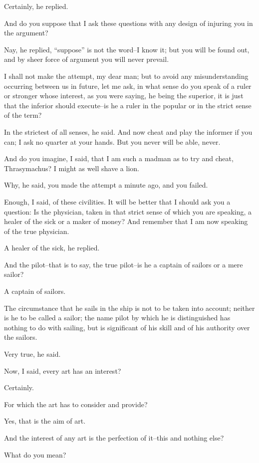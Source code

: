 Certainly, he replied.

And do you suppose that I ask these questions with any design of
injuring you in the argument?

Nay, he replied, ``suppose'' is not the word--I know it; but you will be
found out, and by sheer force of argument you will never prevail.

I shall not make the attempt, my dear man; but to avoid any
misunderstanding occurring between us in future, let me ask, in what
sense do you speak of a ruler or stronger whose interest, as you were
saying, he being the superior, it is just that the inferior should
execute--is he a ruler in the popular or in the strict sense of the
term?

In the strictest of all senses, he said. And now cheat and play the
informer if you can; I ask no quarter at your hands. But you never will
be able, never.

And do you imagine, I said, that I am such a madman as to try and cheat,
Thrasymachus? I might as well shave a lion.

Why, he said, you made the attempt a minute ago, and you failed.

Enough, I said, of these civilities. It will be better that I should ask
you a question: Is the physician, taken in that strict sense of which
you are speaking, a healer of the sick or a maker of money? And remember
that I am now speaking of the true physician.

A healer of the sick, he replied.

And the pilot--that is to say, the true pilot--is he a captain of
sailors or a mere sailor?

A captain of sailors.

The circumstance that he sails in the ship is not to be taken into
account; neither is he to be called a sailor; the name pilot by which he
is distinguished has nothing to do with sailing, but is significant of
his skill and of his authority over the sailors.

Very true, he said.

Now, I said, every art has an interest?

Certainly.

For which the art has to consider and provide?

Yes, that is the aim of art.

And the interest of any art is the perfection of it--this and nothing
else?

What do you mean?

